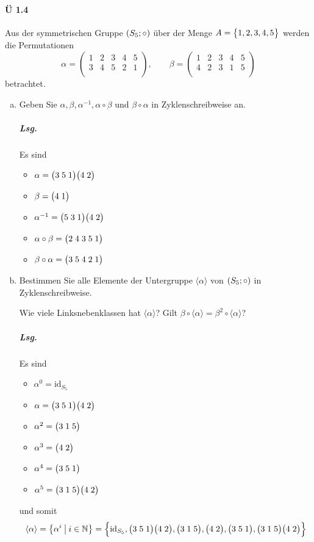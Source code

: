 \documentclass{scrreprt}
\begin{document}
\paragraph{Ü 1.4} Aus der symmetrischen Gruppe $\qty(S_5; \circ)$ über der
Menge $A = \qty\big{1, 2, 3, 4, 5}$ werden die Permutationen
\[
  \alpha = \begin{pmatrix}
    1 & 2 & 3 & 4 & 5 \\
    3 & 4 & 5 & 2 & 1 \\
  \end{pmatrix}, \qquad
  \beta = \begin{pmatrix}
    1 & 2 & 3 & 4 & 5 \\
    4 & 2 & 3 & 1 & 5 \\
  \end{pmatrix}
\]
betrachtet.
\begin{enumerate}[(a)]
\item Geben Sie $\alpha, \beta, \alpha^{-1}, \alpha \circ \beta$ und
  $\beta \circ \alpha$ in Zyklenschreibweise an.

  \subparagraph{Lsg.} Es sind
  \begin{itemize}
  \item $\alpha = \qty\big(3\;5\;1)\qty\big(4\;2)$
  \item $\beta = \qty\big(4\;1)$
  \item $\alpha^{-1} = \qty\big(5\;3\;1)\qty\big(4\;2)$
  \item $\alpha \circ \beta = \qty\big(2\;4\;3\;5\;1)$
  \item $\beta \circ \alpha = \qty\big(3\;5\;4\;2\;1)$
  \end{itemize}

\item Bestimmen Sie alle Elemente der Untergruppe $\langle \alpha \rangle$
  von $\qty(S_5; \circ)$ in Zyklenschreibweise.

  Wie viele Linksnebenklassen hat $\langle \alpha \rangle$?
  Gilt
  $\beta \circ \langle \alpha \rangle = \beta^2 \circ \langle \alpha \rangle$?

  \subparagraph{Lsg.} Es sind
  \begin{itemize}
  \item $\alpha^0 = \text{id}_{S_5}$
  \item $\alpha = \qty\big(3\;5\;1)\qty\big(4\;2)$
  \item $\alpha^2 = \qty\big(3\;1\;5)$
  \item $\alpha^3 = \qty\big(4\;2)$
  \item $\alpha^4 = \qty\big(3\;5\;1)$
  \item $\alpha^5 = \qty\big(3\;1\;5)\qty\big(4\;2)$
  \end{itemize}
  und somit
  \[
    \langle \alpha \rangle = \qty{\alpha^i \:{\big |}\: i \in \mathbb{N}}
    = \qty\Big{
      \text{id}_{S_5},
      \qty\big(3\;5\;1)\qty\big(4\;2),
      \qty\big(3\;1\;5),
      \qty\big(4\;2),
      \qty\big(3\;5\;1),
      \qty\big(3\;1\;5)\qty\big(4\;2)
    }
  \]


\end{enumerate}
\end{document}
